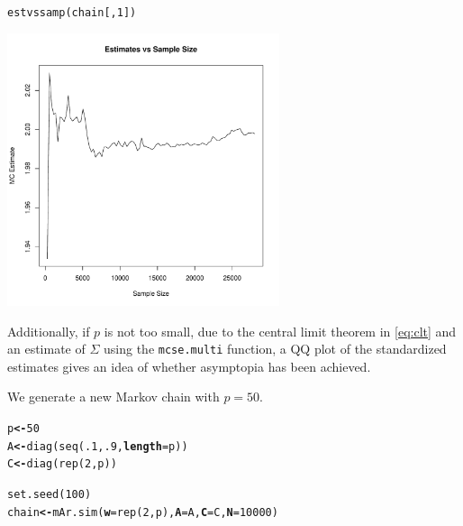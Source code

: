 \documentclass[11pt]{article}\usepackage[]{graphicx}\usepackage[]{color}
\makeatletter
\newcommand{\hlnum}[1]{\textcolor[rgb]{1,0.078,0.576}{#1}}%
\newcommand{\hlstd}[1]{\textcolor[rgb]{0,0,0}{#1}}%
\newcommand{\hlkwb}[1]{\textcolor[rgb]{0.18,0.545,0.341}{\textbf{#1}}}%
\newcommand{\hlkwc}[1]{\textcolor[rgb]{0.412,0.412,0.412}{\textbf{#1}}}%
\newcommand{\hlkwd}[1]{\textcolor[rgb]{0,0,0.561}{#1}}%
\newenvironment{kframe}{%
 \def\at@end@of@kframe{}%
 \ifinner\ifhmode%
  \def\at@end@of@kframe{\end{minipage}}%
  \begin{minipage}{\columnwidth}%
 \fi\fi%
 \def\FrameCommand##1{\hskip\@totalleftmargin \hskip-\fboxsep
 \colorbox{shadecolor}{##1}\hskip-\fboxsep
     \hskip-\linewidth \hskip-\@totalleftmargin \hskip\columnwidth}%
 \MakeFramed {\advance\hsize-\width
   \@totalleftmargin\z@ \linewidth\hsize
   \@setminipage}}%
 {\par\unskip\endMakeFramed%
 \at@end@of@kframe}
\newenvironment{knitrout}{}{} %
\makeatother
\begin{document}
\begin{knitrout}
\color{fgcolor}\begin{kframe}
\begin{alltt}
\hlkwd{estvssamp}\hlstd{(chain[,}\hlnum{1}\hlstd{])}
\end{alltt}
\end{kframe}
\includegraphics[width=8cm]{figure/estvssamp-1} 

\end{knitrout}

Additionally, if $p$ is not too small, due to the central limit theorem in \eqref{eq:clt} and an estimate of $\Sigma$ using the \texttt{mcse.multi} function, a QQ plot of the standardized estimates gives an idea of whether asymptopia has been achieved.

We generate a new Markov chain with $p = 50$.

\begin{knitrout}
\color{fgcolor}\begin{kframe}
\begin{alltt}
\hlstd{p} \hlkwb{<-} \hlnum{50}
\hlstd{A} \hlkwb{<-} \hlkwd{diag}\hlstd{(}\hlkwd{seq}\hlstd{(}\hlnum{.1}\hlstd{,} \hlnum{.9}\hlstd{,} \hlkwc{length} \hlstd{= p))}
\hlstd{C} \hlkwb{<-} \hlkwd{diag}\hlstd{(}\hlkwd{rep}\hlstd{(}\hlnum{2}\hlstd{, p))}

\hlkwd{set.seed}\hlstd{(}\hlnum{100}\hlstd{)}
\hlstd{chain} \hlkwb{<-} \hlkwd{mAr.sim}\hlstd{(}\hlkwc{w} \hlstd{=} \hlkwd{rep}\hlstd{(}\hlnum{2}\hlstd{,p),} \hlkwc{A} \hlstd{= A,} \hlkwc{C} \hlstd{= C,} \hlkwc{N} \hlstd{=} \hlnum{10000}\hlstd{)}
\end{alltt}
\end{kframe}
\end{knitrout}
\end{document}
